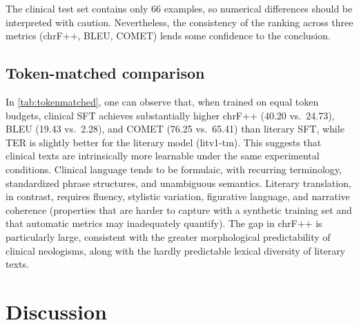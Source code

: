 \documentclass[11pt,a4paper]{article}
\begin{document}
The clinical test set contains only 66 examples, so numerical
differences should be interpreted with caution. Nevertheless, the
consistency of the ranking across three metrics (chrF++, BLEU, COMET)
lends some confidence to the conclusion.

\subsection{Token-matched comparison}

\begin{table}[H]
\small
\centering
{}
\caption{Token-matched CA$\to$EU results. Both models are trained on
approximately 360,000 source tokens and evaluated on their respective
domain test sets.}
\label{tab:tokenmatched}
\end{table}

In \autoref{tab:tokenmatched}, one can observe that, when trained on equal token budgets, clinical SFT achieves substantially
higher chrF++ (40.20 vs.\ 24.73), BLEU (19.43 vs.\ 2.28), and COMET
(76.25 vs.\ 65.41) than literary SFT, while TER is slightly better for
the literary model (litv1-tm). This suggests that clinical texts are intrinsically
more learnable under the same experimental conditions. Clinical
language tends to be formulaic, with recurring terminology, standardized
phrase structures, and unambiguous semantics. Literary translation, in
contrast, requires fluency, stylistic variation, figurative language, and
narrative coherence (pro\-perties that are harder to capture with a
synthetic training set and that automatic metrics may inadequately
quantify). The gap in chrF++ is particularly large, consistent with the
greater morphological predictability of clinical neologisms, along with the hardly predictable lexical diversity of literary texts.

\section{Discussion}
\label{sec:discussion}
\end{document}
